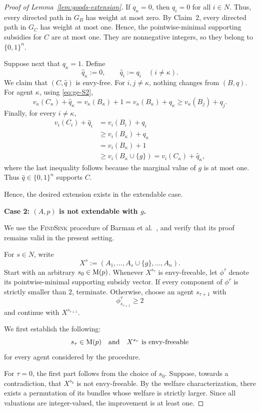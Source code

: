 \begin{proof}[Proof of Lemma~\ref{lem:goods-extension}]
If $q_\kappa=0$, then $q_i=0$ for all $i\in N$. Thus, every directed path in
$G_B$ has weight at most zero. By Claim~2, every directed path in $G_C$ has
weight at most one. Hence, the pointwise-minimal supporting subsidies for $C$
are at most one. They are nonnegative integers, so they belong to $\{0,1\}^n$.

Suppose next that $q_\kappa=1$. Define
\[
  \widehat q_\kappa:=0,
  \qquad
  \widehat q_i:=q_i
  \quad (i\neq\kappa).
\]
We claim that $(C,\widehat q)$ is envy-free. For $i,j\neq\kappa$, nothing changes
from $(B,q)$. For agent $\kappa$, using \eqref{eq:ge-S2},
\[
  v_\kappa(C_\kappa)+\widehat q_\kappa
  =
  v_\kappa(B_\kappa)+1
  =
  v_\kappa(B_\kappa)+q_\kappa
  \geq
  v_\kappa(B_j)+q_j.
\]
Finally, for every $i\neq\kappa$,
\[
\begin{aligned}
  v_i(C_i)+\widehat q_i
  &=v_i(B_i)+q_i\\
  &\geq v_i(B_\kappa)+q_\kappa\\
  &=v_i(B_\kappa)+1\\
  &\geq v_i(B_\kappa\cup\{g\})
   =v_i(C_\kappa)+\widehat q_\kappa,
\end{aligned}
\]
where the last inequality follows because the marginal value of $g$ is at most
one. Thus $\widehat q\in\{0,1\}^n$ supports $C$.

Hence, the desired extension exists in the extendable case.

\medskip
\noindent
\textbf{Case 2: $(A,p)$ is not extendable with $g$.}

We use the \textsc{FindSink} procedure of Barman et al.~\cite{BKNS22}, and
verify that its proof remains valid in the present setting.

For $s\in N$, write
\[
  X^s:=(A_1,\ldots,A_s\cup\{g\},\ldots,A_n).
\]
Start with an arbitrary $s_0\in \mathrm{M}(p)$. Whenever $X^{s_\tau}$ is
envy-freeable, let $\phi^\tau$ denote its pointwise-minimal supporting subsidy
vector. If every component of $\phi^\tau$ is strictly smaller than $2$,
terminate. Otherwise, choose an agent $s_{\tau+1}$ with
\[
  \phi^\tau_{s_{\tau+1}}\geq2
\]
and continue with $X^{s_{\tau+1}}$.

We first establish the following:
\begin{equation}\label{eq:ge-S3}
  s_\tau\in \mathrm{M}(p)
  \quad\text{and}\quad
  X^{s_\tau}\text{ is envy-freeable}
\end{equation}
for every agent considered by the procedure.

For $\tau=0$, the first part follows from the choice of $s_0$. Suppose, towards
a contradiction, that $X^{s_0}$ is not envy-freeable. By the welfare
characterization, there exists a permutation of its bundles whose welfare is
strictly larger. Since all valuations are integer-valued, the improvement is at
least one.


\end{proof}
